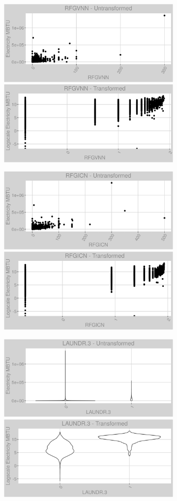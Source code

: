 \newpage
\begin{figure}
\centering
\begin{subfigure}{1\textwidth}
\centering
\includegraphics[width=.49\textwidth, height=0.3\textheight]{Images/electricity_var_original_6.png}
\includegraphics[width=.49\textwidth, height=0.3\textheight]{Images/electricity_var_transformed_6.png}
\end{subfigure}
\begin{subfigure}{1\textwidth}
\centering
\includegraphics[width=.49\textwidth, height=0.3\textheight]{Images/electricity_var_original_7.png}
\includegraphics[width=.49\textwidth, height=0.3\textheight]{Images/electricity_var_transformed_7.png}
\end{subfigure}
\begin{subfigure}{1\textwidth}
\centering
\includegraphics[width=.49\textwidth, height=0.3\textheight]{Images/electricity_var_original_8.png}
\includegraphics[width=.49\textwidth, height=0.3\textheight]{Images/electricity_var_transformed_8.png}
\end{subfigure}
\end{figure}
